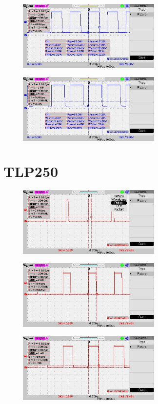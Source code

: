 \documentclass[a4paper, 11pt, oneside]{uet_thesis}  %
\begin{document}
	\begin{figure}[htbp]
	\centering
	\includegraphics[width = 2.8in]{./Figures/4n35/7}
\end{figure}	

	\begin{figure}[htbp]
	\centering
	\includegraphics[width = 2.8in]{./Figures/4n35/9}
\end{figure}	
	\newpage
\section{TLP250}

\begin{figure}[htbp]
	\centering
	\includegraphics[width = 2.8in]{./Figures/tlp/1}
\end{figure}	

\begin{figure}[htbp]
	\centering
	\includegraphics[width = 2.8in]{./Figures/tlp/2}
\end{figure}	

\begin{figure}[htbp]
	\centering
	\includegraphics[width = 2.8in]{./Figures/tlp/3}
\end{figure}	
\end{document}
